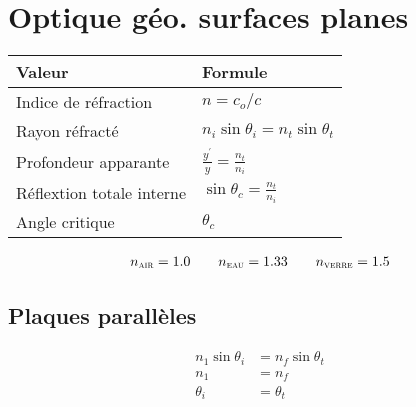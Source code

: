 \section{Optique géo. surfaces planes}
\vspace{-2\baselineskip}
\begin{tabular}{ll}
    Valeur & Formule \\\hline
    Indice de réfraction & \(n=c_o/c\)\\
    Rayon réfracté & \(n_i\sin{\theta_i} = n_t\sin{\theta_t}\)\\[2pt]
    Profondeur apparante & \(\frac{y^\prime}{y}=\frac{n_t}{n_i}\)\\[8pt]
    Réflextion totale interne & \(\sin{\theta_c}=\frac{n_t}{n_i}\)\\
    Angle critique & $\theta_c$
\end{tabular}

\begin{gather*}
    n_{\textsc{air}}=1.0 \qquad n_{\textsc{eau}}=1.33 \qquad n_{\textsc{verre}}=1.5
\end{gather*}

\subsection{Plaques parallèles}
\begin{align*}
    n_1\sin{\theta_i} &= n_f\sin{\theta_t}\\
    n_1 &= n_f\\
    \theta_i &= \theta_t
\end{align*}